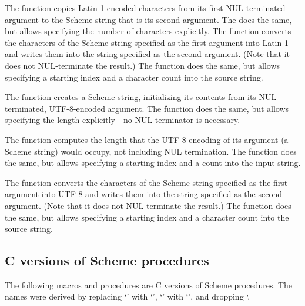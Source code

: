 The  function copies
Latin-1-encoded characters from its first NUL-terminated argument to
the Scheme string that is its second argument.  The
 does the same, but allows
specifying the number of characters explicitly.  The
 function converts the
characters of the Scheme string specified as the first argument into
Latin-1 and writes them into the string specified as the second
argument.  (Note that it does not NUL-terminate the result.)  The
 function does the same, but
allows specifying a starting index and a character count into the
source string.

The  function creates a Scheme
string, initializing its contents from its NUL-terminated,
UTF-8-encoded argument.  The 
function does the same, but allows specifying the length
explicitly---no NUL terminator is necessary.

The  function computes the length
that the UTF-8 encoding of its argument (a Scheme string) would
occupy, not including NUL termination.  The
 function does the same, but allows
specifying a starting index and a count into the input string.

The  function converts the
characters of the Scheme string specified as the first argument into
UTF-8 and writes them into the string specified as the second
argument.  (Note that it does not NUL-terminate the result.)  The
 function does the same, but
allows specifying a starting index and a character count into the
source string.

\subsection{C versions of Scheme procedures}

The following macros and procedures are C versions of Scheme procedures.
The names were derived by replacing `\code{-}' with `\code{\_}',
 `' with `', and dropping `\code{!}.

